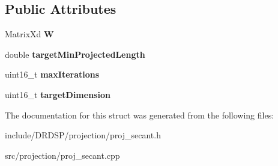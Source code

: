 \subsection*{Public Attributes}
\begin{DoxyCompactItemize}
\item 
\hypertarget{struct_d_r_d_s_p_1_1_proj_secant_a99ab0daf8cb539f9ecf07132d3994357}{Matrix\-Xd {\bfseries W}}\label{struct_d_r_d_s_p_1_1_proj_secant_a99ab0daf8cb539f9ecf07132d3994357}

\item 
\hypertarget{struct_d_r_d_s_p_1_1_proj_secant_a422dde54e49a8b5ab4f631fc0b8cf829}{double {\bfseries target\-Min\-Projected\-Length}}\label{struct_d_r_d_s_p_1_1_proj_secant_a422dde54e49a8b5ab4f631fc0b8cf829}

\item 
\hypertarget{struct_d_r_d_s_p_1_1_proj_secant_a0bb6d9c68ea6f5caa7831e1d359e8e57}{uint16\-\_\-t {\bfseries max\-Iterations}}\label{struct_d_r_d_s_p_1_1_proj_secant_a0bb6d9c68ea6f5caa7831e1d359e8e57}

\item 
\hypertarget{struct_d_r_d_s_p_1_1_proj_secant_ab653acb909a2e1be1c2f9a8e04876466}{uint16\-\_\-t {\bfseries target\-Dimension}}\label{struct_d_r_d_s_p_1_1_proj_secant_ab653acb909a2e1be1c2f9a8e04876466}

\end{DoxyCompactItemize}


The documentation for this struct was generated from the following files\-:\begin{DoxyCompactItemize}
\item 
include/\-D\-R\-D\-S\-P/projection/proj\-\_\-secant.\-h\item 
src/projection/proj\-\_\-secant.\-cpp\end{DoxyCompactItemize}

